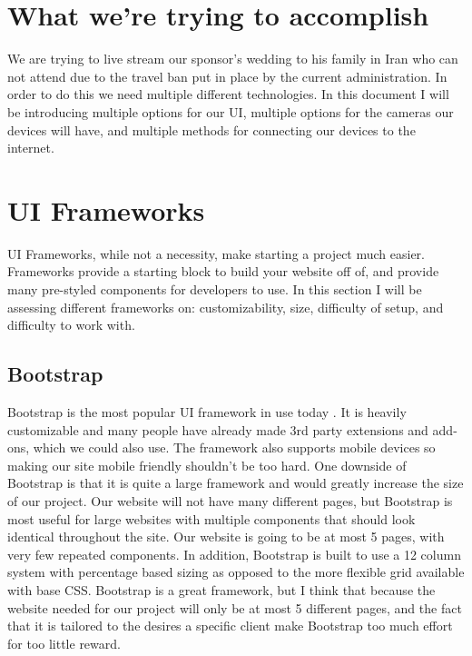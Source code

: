 \documentclass[onecolumn, draftclsnofoot,10pt, compsoc]{IEEEtran}
\begin{document}

\section{What we're trying to accomplish}
We are trying to live stream our sponsor's wedding to his family in Iran who can not attend due to the travel ban put in place by the current administration. In order to do this we need multiple different technologies. In this document I will be introducing multiple options for our UI, multiple options for the cameras our devices will have, and multiple methods for connecting our devices to the internet.

\section{UI Frameworks}
    UI Frameworks, while not a necessity, make starting a project much easier. Frameworks provide a starting block to build your website off of, and provide many pre-styled components for developers to use. In this section I will be assessing different frameworks on: customizability, size, difficulty of setup, and difficulty to work with.
    \subsection{Bootstrap}
    Bootstrap is the most popular UI framework in use today \cite{IEEEhowto:Bootstrap}. It is heavily customizable and many people have already made 3rd party extensions and add-ons, which we could also use. The framework also supports mobile devices so making our site mobile friendly shouldn't be too hard. One downside of Bootstrap is that it is quite a large framework and would greatly increase the size of our project. Our website will not have many different pages, but Bootstrap is most useful for large websites with multiple components that should look identical throughout the site. Our website is going to be at most 5 pages, with very few repeated components. In addition, Bootstrap is built to use a 12 column system with percentage based sizing as opposed to the more flexible grid available with base CSS. Bootstrap is a great framework, but I think that because the website needed for our project will only be at most 5 different pages, and the fact that it is tailored to the desires a specific client make Bootstrap too much effort for too little reward.
\end{document}
